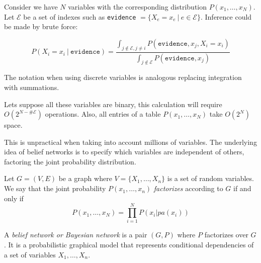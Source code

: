 Consider we have \(N\) variables with the corresponding distribution
\(P(x_1,\dots,x_N)\). Let \(\mathcal{E}\) be a set of indexes such as \texttt{evidence}
\(=\{X_e = x_e \ | \ e \in \mathcal{E}\}\). Inference could be made by brute
force:

\[
P(X_i = x_i \ | \ \texttt{evidence}) = \frac{ \int_{ j \not \in
\mathcal{E}, j \neq i } P(\texttt{evidence}, x_j, X_i = x_i)}{ \int_{ j
\not \in \mathcal{E} } P(\texttt{evidence}, x_j)}
\]

The notation when using discrete variables is analogous replacing integration
with summations.

Lets suppose all these variables are binary, this calculation will require
\(O(2^{N-\#\mathcal{E}})\) operations. Also, all entries of a table \(P(x_1,\dots,
x_N)\) take \(O(2^N)\) space.

This is unpractical when taking into account millions of variables. The
underlying idea of belief networks is to specify which variables are independent
of others, factoring the joint probability distribution.

\begin{definition}
Let \(G=(V,E)\) be a graph where \(V = \{X_1,\dots,X_n\}\) is a set of random
variables. We say that the joint
probability \(P(x_1, \dots, x_n)\) \emph{factorizes} according to \(G\) if and
only if
\[
P(x_1,\dots,x_N) = \prod_{i=1}^{N}P(x_i | pa(x_i))
\]
\end{definition}

\begin{definition}
A \emph{belief network or Bayesian network} is a pair \((G, P)\)
where \(P\) factorizes over \(G\). It is a probabilistic graphical model
that represents conditional dependencies of a set of variables \(X_1,\dots, X_n\).
\end{definition}

\begin{figure}
  \centering
    \label{fig:bn_example}
\end{figure}


